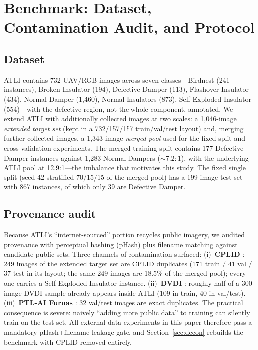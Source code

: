 \documentclass[conference]{IEEEtran}
\newcommand{\dd}{Defective Damper}
\begin{document}
\section{Benchmark: Dataset, Contamination Audit, and Protocol}
\label{sec:bench}

\subsection{Dataset}
ATLI \cite{tsai2025atli} contains 732 UAV/RGB images across seven classes---Birdnest (241 instances), Broken Insulator (194), \dd{} (113), Flashover Insulator (434), Normal Damper (1{,}460), Normal Insulators (873), Self-Exploded Insulator (554)---with the defective region, not the whole component, annotated. We extend ATLI with additionally collected images at two scales: a 1{,}046-image \emph{extended target set} (kept in a 732/157/157 train/val/test layout) and, merging further collected images, a 1{,}343-image \emph{merged pool} used for the fixed-split and cross-validation experiments. The merged training split contains 177 \dd{} instances against 1{,}283 Normal Dampers (${\sim}7.2{:}1$), with the underlying ATLI pool at 12.9:1---the imbalance that motivates this study. The fixed single split (seed-42 stratified 70/15/15 of the merged pool) has a 199-image test set with 867 instances, of which only 39 are \dd{}.

\subsection{Provenance audit}
\label{sec:leakage}
Because ATLI's ``internet-sourced'' portion recycles public imagery, we audited provenance with perceptual hashing (pHash) plus filename matching against candidate public sets. Three channels of contamination surfaced: (i)~\textbf{CPLID} \cite{tao2020insulator}: 249 images of the extended target set are CPLID duplicates (171 train / 41 val / 37 test in its layout; the same 249 images are 18.5\% of the merged pool); every one carries a Self-Exploded Insulator instance. (ii)~\textbf{DVDI} \cite{bao2022bcyolo}: roughly half of a 300-image DVDI sample already appears inside ATLI (109 in train, 40 in val/test). (iii)~\textbf{PTL-AI Furnas} \cite{oliveira2022furnas}: 32 val/test images are exact duplicates. The practical consequence is severe: naively ``adding more public data'' to training can silently train on the test set. All external-data experiments in this paper therefore pass a mandatory pHash+filename leakage gate, and Section~\ref{sec:decon} rebuilds the benchmark with CPLID removed entirely.
\end{document}
